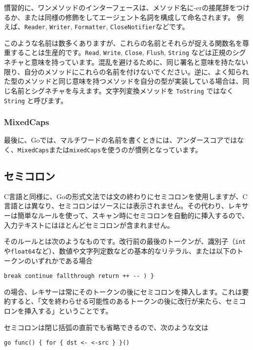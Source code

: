\documentclass{jsarticle}
\begin{document}
慣習的に、ワンメソッドのインターフェースは、メソッド名に-erの接尾辞をつけるか、または同様の修飾をしてエージェント名詞を構成して命名されます。
例えば、\texttt{Reader}, \texttt{Writer}, \texttt{Formatter},
\texttt{CloseNotifier}などです。

このような名前は数多くありますが、これらの名前とそれらが捉える関数名を尊重することは生産的です。\texttt{Read},
\texttt{Write}, \texttt{Close}, \texttt{Flush}, \texttt{String}
などは正規のシグネチャと意味を持っています。混乱を避けるために、同じ署名と意味を持たない限り、自分のメソッドにこれらの名前を付けないでください。逆に、よく知られた型のメソッドと同じ意味を持つメソッドを自分の型が実装している場合は、同じ名前とシグネチャを与えます。文字列変換メソッドを
\texttt{ToString} ではなく \texttt{String} と呼びます。

\subsubsection{MixedCaps}

最後に、Goでは、マルチワードの名前を書くときには、アンダースコアではなく、\texttt{MixedCaps}または\texttt{mixedCaps}を使うのが慣例となっています。

\subsection{セミコロン}

C言語と同様に、Goの形式文法では文の終わりにセミコロンを使用しますが、C言語とは異なり、セミコロンはソースには表示されません。その代わり、レキサーは簡単なルールを使って、スキャン時にセミコロンを自動的に挿入するので、入力テキストにはほとんどセミコロンが含まれません。

そのルールとは次のようなものです。改行前の最後のトークンが、識別子（\texttt{int}や\texttt{float64}など）、数値や文字列定数などの基本的なリテラル、または以下のトークンのいずれかである場合

\begin{lstlisting}[numbers=none]
break continue fallthrough return ++ -- ) }
\end{lstlisting}

の場合、レキサーは常にそのトークンの後にセミコロンを挿入します。これは要約すると、「文を終わらせる可能性のあるトークンの後に改行が来たら、セミコロンを挿入する」ということです。

セミコロンは閉じ括弧の直前でも省略できるので、次のような文は

\begin{lstlisting}[numbers=none]
    go func() { for { dst <- <-src } }()
\end{lstlisting}
\end{document}
